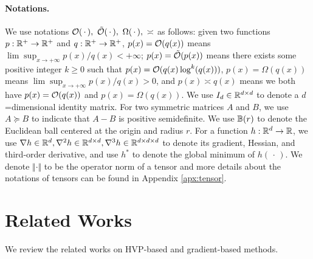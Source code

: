 \documentclass[twoside,11pt]{article}
\begin{document}
\paragraph{Notations.}
We use notations ${\mathcal{O}}(\,\cdot\,),~ \tilde {{\mathcal{O}}}(\,\cdot\,),~ \Omega(\,\cdot\,),~ \asymp$ as follows: given two functions $p: {\mathbb{R}}^+ \rightarrow {\mathbb{R}}^+$ and $q: {\mathbb{R}}^+ \rightarrow {\mathbb{R}}^+$,  $p(x) = {\mathcal{O}}(q(x))$ means $ \lim \sup_{x \rightarrow +\infty} {p(x)}/{q(x)} < +\infty $; $p(x) = \tilde {{\mathcal{O}}}(p(x)) $ means there exists some positive integer $k \ge 0$ such that $p(x) = {\mathcal{O}}(q(x) \log^k (q(x)))$, $p(x) = \Omega(q(x))$ means $ \lim \sup_{x \rightarrow + \infty} p(x) / q(x) >0$, and $p(x) \asymp q(x)$ means we both have $p(x) = {\mathcal{O}}(q(x))$ and $p(x) = \Omega(q(x))$.
We use $I_d \in {\mathbb{R}}^{d\times d}$ to denote a $d$=dimensional identity matrix. For two symmetric matrices $A$ and $B$, we use $A \succeq B$ to indicate that $A-B$ is positive semidefinite.
We use ${\mathbb{B}}(r)$ to denote the Euclidean ball centered at the origin and radius $r$.
For a function $h: {\mathbb{R}}^d \rightarrow {\mathbb{R}}$, we use $\nabla h \in {\mathbb{R}}^d, \nabla^2 h \in {\mathbb{R}}^{d \times d},  \nabla^3 h \in {\mathbb{R}}^{d \times d \times d}$ to denote its gradient, Hessian, and third-order derivative, and use $h^*$ to denote the global minimum of $h(\,\cdot\,)$. We
denote $\Vert \cdot\Vert$ to be the operator norm of a tensor and more details about the notations of tensors can be found in Appendix \ref{apx:tensor}.

\section{Related Works}

We review the related works on HVP-based and gradient-based methods.
\end{document}
